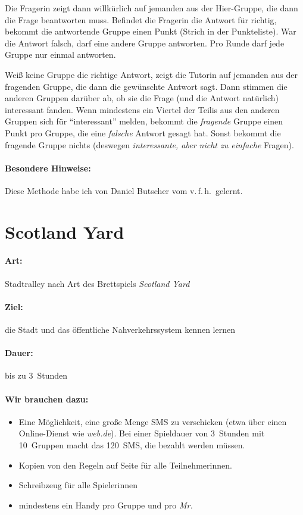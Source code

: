 Die Fragerin zeigt dann willkürlich auf jemanden aus der Hier-Gruppe, die dann die Frage beantworten muss. Befindet die Fragerin die Antwort für richtig, bekommt die antwortende Gruppe einen Punkt (Strich in der Punkteliste). War die Antwort falsch, darf eine andere Gruppe antworten. Pro Runde darf jede Gruppe nur einmal antworten.

Weiß keine Gruppe die richtige Antwort, zeigt die Tutorin auf jemanden aus der fragenden Gruppe, die dann die gewünschte Antwort sagt. Dann stimmen die anderen Gruppen darüber ab, ob sie die Frage (und die Antwort natürlich) interessant fanden. Wenn mindestens ein Viertel der Teilis aus den anderen Gruppen sich für "`interessant"' melden, bekommt die \emph{fragende} Gruppe einen Punkt pro Gruppe, die eine \emph{falsche} Antwort gesagt hat. Sonst bekommt die fragende Gruppe nichts (deswegen \emph{interessante, aber nicht zu einfache} Fragen).
\paragraph{Besondere Hinweise:} Diese Methode habe ich von Daniel Butscher vom v.\,f.\,h.~gelernt.

\section{Scotland Yard}
\paragraph{Art:} Stadtralley nach Art des Brettspiels \emph{Scotland Yard}
\paragraph{Ziel:} die Stadt und das öffentliche Nahverkehrssystem kennen lernen
\paragraph{Dauer:} bis zu 3~Stunden
\paragraph{Wir brauchen dazu:}
\begin{itemize}
  \item Eine Möglichkeit, eine große Menge SMS zu verschicken (etwa über einen Online-Dienst wie \emph{web.de}). Bei einer Spieldauer von 3~Stunden mit 10~Gruppen macht das 120~SMS, die bezahlt werden müssen.
    \item Kopien von den Regeln auf Seite \pageref{scotland-yard-regeln} für alle Teilnehmerinnen.
  \item Schreibzeug für alle Spielerinnen
  \item mindestens ein Handy pro Gruppe und pro \emph{Mr.}
\end{itemize}


